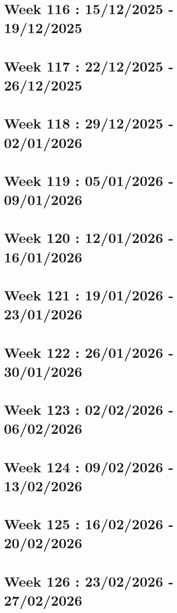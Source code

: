 \documentclass[french]{article}
\begin{document}
	\section{Week 116 : 15/12/2025 - 19/12/2025}

	\section{Week 117 : 22/12/2025 - 26/12/2025}

	\section{Week 118 : 29/12/2025 - 02/01/2026}

	\section{Week 119 : 05/01/2026 - 09/01/2026}

	\section{Week 120 : 12/01/2026 - 16/01/2026}

	\section{Week 121 : 19/01/2026 - 23/01/2026}

	\section{Week 122 : 26/01/2026 - 30/01/2026}

	\section{Week 123 : 02/02/2026 - 06/02/2026}

	\section{Week 124 : 09/02/2026 - 13/02/2026}

	\section{Week 125 : 16/02/2026 - 20/02/2026}

	\section{Week 126 : 23/02/2026 - 27/02/2026}
\end{document}
